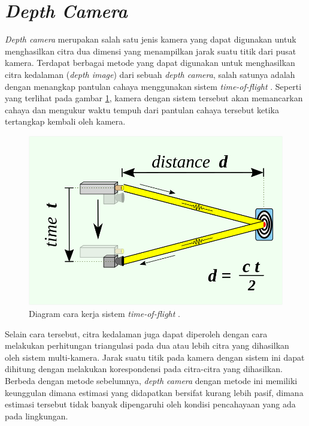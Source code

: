 \section{\emph{Depth Camera}}
\label{sec:depthcamera}

\emph{Depth camera} merupakan salah satu jenis kamera yang dapat digunakan untuk menghasilkan citra dua dimensi yang menampilkan jarak suatu titik dari pusat kamera.
Terdapat berbagai metode yang dapat digunakan untuk menghasilkan citra kedalaman (\emph{depth image}) dari sebuah \emph{depth camera},
  salah satunya adalah dengan menangkap pantulan cahaya menggunakan sistem \emph{time-of-flight} \citep{cit:idan2001}.
Seperti yang terlihat pada gambar \ref{fig:diagramtimeofflight},
  kamera dengan sistem tersebut akan memancarkan cahaya dan mengukur waktu tempuh dari pantulan cahaya tersebut ketika tertangkap kembali oleh kamera.

\begin{figure}[ht]
  \centering
  \includegraphics[scale=0.2]{gambar/diagram-time-of-flight.png}
  \caption{Diagram cara kerja sistem \emph{time-of-flight} \citep{url:timeofflight}.}
  \label{fig:diagramtimeofflight}
\end{figure}

Selain cara tersebut,
  citra kedalaman juga dapat diperoleh dengan cara melakukan perhitungan triangulasi pada dua atau lebih citra yang dihasilkan oleh sistem multi-kamera.
Jarak suatu titik pada kamera dengan sistem ini dapat dihitung dengan melakukan korespondensi pada citra-citra yang dihasilkan.
Berbeda dengan metode sebelumnya,
  \emph{depth camera} dengan metode ini memiliki keunggulan dimana estimasi yang didapatkan bersifat kurang lebih pasif,
  dimana estimasi tersebut tidak banyak dipengaruhi oleh kondisi pencahayaan yang ada pada lingkungan.

